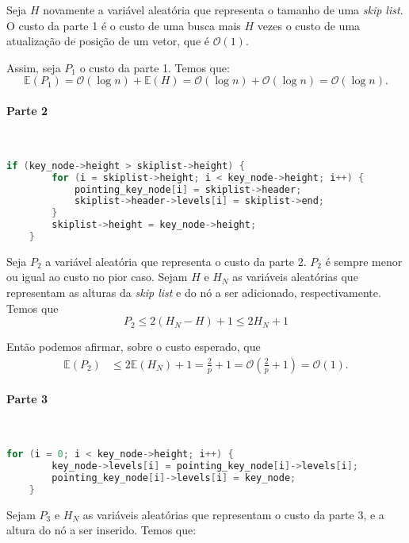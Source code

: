 \documentclass[paper=a4, fontsize=11pt]{scrartcl} %
\numberwithin{equation}{section}
\numberwithin{figure}{section}
\numberwithin{table}{section}
\numberwithin{definition}{section}
\numberwithin{theorem}{section}
\numberwithin{property}{section}
\numberwithin{proposition}{section}
\newcommand{\cO}{\ensuremath{\mathcal{O}}}
\renewcommand{\sl}{\textit{skip list}\xspace}
\newcommand{\Exp}{\ensuremath{{\mathbb{E}}}\xspace}
\begin{document}
Seja $H$ novamente a variável aleatória que representa o tamanho de uma \sl.
O custo da parte 1 é o custo de uma busca mais $H$ vezes o custo de uma atualização de posição de um vetor,
que é $\cO(1)$.

Assim, seja $P_1$ o custo da parte 1. Temos que:
$$
  \Exp(P_1) = \cO(\log n) + \Exp(H) = \cO(\log n) + \cO(\log n) = \cO(\log n).
$$


\paragraph{Parte 2}
\ \\

\begin{lstlisting}[caption=Inserção Parte 2., language=C]
    if (key_node->height > skiplist->height) {            
        for (i = skiplist->height; i < key_node->height; i++) {
            pointing_key_node[i] = skiplist->header;
            skiplist->header->levels[i] = skiplist->end;
        }
        skiplist->height = key_node->height;
    }                                                      
\end{lstlisting}

Seja $P_2$ a variável aleatória que representa o custo da parte 2. $P_2$ é sempre menor ou igual ao custo no pior
caso. Sejam $H$ e $H_N$ as variáveis aleatórias que representam as alturas da \sl e do nó a ser adicionado,
respectivamente. Temos que
$$
P_2 \leq 2(H_N - H) + 1 \leq 2 H_N + 1 
$$

Então podemos afirmar, sobre o custo esperado, que
\begin{align*}
\Exp(P_2) &\leq 2\Exp(H_N) + 1 = \frac{2}{p} + 1  = \cO \left( \frac{2}{p} + 1 \right) = \cO(1).
\end{align*}


\paragraph{Parte 3}
\ \\

\begin{lstlisting}[caption=Inserção Parte 3., language=C]
    for (i = 0; i < key_node->height; i++) {                     
        key_node->levels[i] = pointing_key_node[i]->levels[i];
        pointing_key_node[i]->levels[i] = key_node;
    }                                                           
\end{lstlisting}

Sejam $P_3$ e $H_N$ as variáveis aleatórias que representam o custo da parte 3, e a altura do nó a ser
inserido. Temos que:
\end{document}

